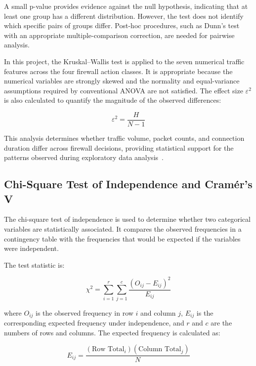 A small p-value provides evidence against the null hypothesis, indicating that at least one group has a different distribution. However, the test does not identify which specific pairs of groups differ. Post-hoc procedures, such as Dunn's test with an appropriate multiple-comparison correction, are needed for pairwise analysis.

In this project, the Kruskal--Wallis test is applied to the seven numerical traffic features across the four firewall action classes. It is appropriate because the numerical variables are strongly skewed and the normality and equal-variance assumptions required by conventional ANOVA are not satisfied. The effect size $\varepsilon^2$ is also calculated to quantify the magnitude of the observed differences:

\begin{equation}
\varepsilon^2 = \frac{H}{N-1}
\label{eq:kruskal_effect}
\end{equation}

This analysis determines whether traffic volume, packet counts, and connection duration differ across firewall decisions, providing statistical support for the patterns observed during exploratory data analysis~\cite{kruskal1952use}.

\subsection{Chi-Square Test of Independence and Cramér's V}

The chi-square test of independence is used to determine whether two categorical variables are statistically associated. It compares the observed frequencies in a contingency table with the frequencies that would be expected if the variables were independent.

The test statistic is:

\begin{equation}
\chi^2 =
\sum_{i=1}^{r}\sum_{j=1}^{c}
\frac{(O_{ij}-E_{ij})^2}{E_{ij}}
\label{eq:chi_square}
\end{equation}

where $O_{ij}$ is the observed frequency in row $i$ and column $j$, $E_{ij}$ is the corresponding expected frequency under independence, and $r$ and $c$ are the numbers of rows and columns. The expected frequency is calculated as:

\begin{equation}
E_{ij} =
\frac{(\text{Row Total}_i)(\text{Column Total}_j)}{N}
\label{eq:expected_frequency}
\end{equation}

